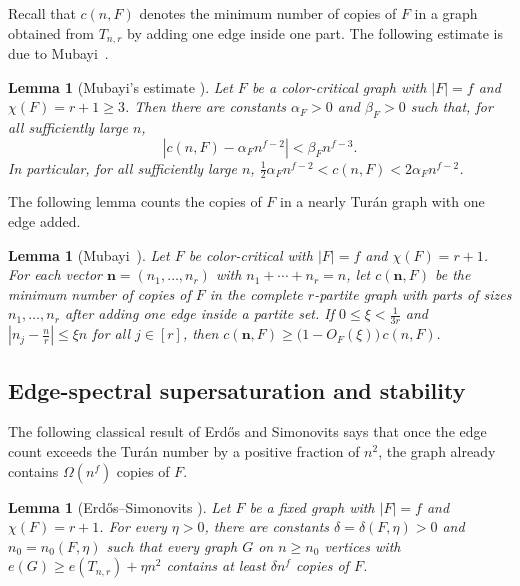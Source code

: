 \documentclass[11pt,a4paper]{article}
\newtheorem{lemma}[theorem]{Lemma}
\theoremstyle{definition}
\theoremstyle{plain}
\renewcommand{\le}{\leqslant}
\renewcommand{\ge}{\geqslant}
\begin{document}
Recall that $c(n,F)$ denotes the minimum number of copies of $F$ in a graph obtained from $T_{n,r}$ by adding one edge inside one part. 
The following estimate is due to Mubayi~\cite{Mub2010}.

\begin{lemma}[Mubayi's estimate \cite{Mub2010}]\label{lem:Mub2010-c}
Let $F$ be a color-critical graph with $|F|=f$ and $\chi(F)=r+1\ge 3$.  Then there are constants $\alpha_F>0$ and $\beta_F>0$ such that, for all sufficiently large $n$,
\[
  \left|c(n,F)-\alpha_F n^{f-2}\right|<\beta_F n^{f-3}.
\]
In particular, for all sufficiently large $n$, $  \frac12\alpha_F n^{f-2}<c(n,F)<2\alpha_F n^{f-2}$. 
\end{lemma}

The following lemma counts the copies of $F$ in a 
nearly Tur\'{a}n graph with one edge added. 

\begin{lemma}[Mubayi~\cite{Mub2010}]\label{lem:near-balanced-one-edge}
Let $F$ be color-critical with $|F|=f$ and $\chi(F)=r+1$.  For each vector $ \mathbf n=(n_1,\ldots,n_r)$ with  $n_1+\cdots+n_r=n$, 
let $c (\mathbf n,F)$ be the minimum number of copies of $F$ in the complete $r$-partite graph with parts of sizes $n_1,\ldots,n_r$ after adding one edge inside a partite set.  If $0\le \xi < \frac{1}{3r}$ and 
$ \left|n_j-\frac nr\right|\le \xi n$ for all $j\in [r]$, 
 then  $  c (\mathbf n,F)\ge \big( 1-O_F(\xi) \big)\, c(n,F).$ 
\end{lemma}


\subsection{Edge-spectral supersaturation and stability}

The following classical result of Erd\H{o}s and Simonovits says
that once the edge count exceeds the
Tur\'an number by a positive fraction of
$n^2$, the graph already contains
$\Omega(n^f)$ copies of $F$. 

\begin{lemma}[Erd\H{o}s--Simonovits \cite{ES1983}] 
\label{lem:ES-supersaturation}
Let $F$ be a fixed graph with $|F|=f$ and $\chi(F)=r+1$.  For every $\eta>0$, there are constants $\delta=\delta(F,\eta)>0$ and $n_0=n_0(F,\eta)$ such that every graph $G$ on $n\ge n_0$ vertices with
$  e(G)\ge e(T_{n,r})+\eta n^2$ 
contains at least $  \delta n^f$ copies of $F$.
\end{lemma}
\end{document}
